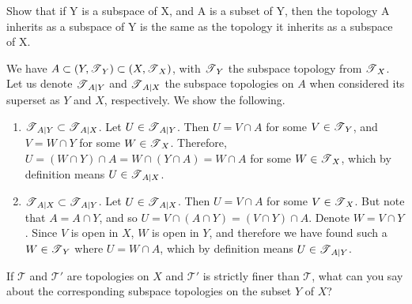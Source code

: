   \begin{exercise}[Munkres 16.1]
    Show that if Y is a subspace of X, and A is a subset of Y, then the topology A inherits as a subspace of Y is the same as the topology it inherits as a subspace of X.
  \end{exercise}
  \begin{solution}[Munkres 16.1]
    We have $A \subset (Y, \T_Y) \subset (X, \T_X)$, with $\T_Y$ the subspace topology from $\T_X$. Let us denote $\T_{A|Y}$ and $\T_{A|X}$ the subspace topologies on $A$ when considered its superset as $Y$ and $X$, respectively. We show the following. 
    \begin{enumerate}
      \item $\T_{A|Y} \subset \T_{A|X}$. Let $U \in \T_{A|Y}$. Then $U = V \cap A$ for some $V \in \T_Y$, and $V = W \cap Y$ for some $W \in \T_X$. Therefore, $U = (W \cap Y) \cap A = W \cap (Y \cap A) = W \cap A$ for some $W \in \T_X$, which by definition means $U \in \T_{A|X}$. 
      \item $\T_{A|X} \subset \T_{A|Y}$. Let $U \in \T_{A|X}$. Then $U = V \cap A$ for some $V \in \T_X$. But note that $A = A \cap Y$, and so $U = V \cap (A \cap Y) = (V \cap Y) \cap A$. Denote $W = V \cap Y$. Since $V$ is open in $X$, $W$ is open in $Y$, and therefore we have found such a $W \in \T_Y$ where $U = W \cap A$, which by definition means $U \in \T_{A|Y}$. 
    \end{enumerate}
  \end{solution}

  \begin{exercise}[Munkres 16.2]
    If $\mathcal{T}$ and $\mathcal{T}'$ are topologies on $X$ and $\mathcal{T}'$ is strictly finer than $\mathcal{T}$, what can you say about the corresponding subspace topologies on the subset $Y$ of $X$?
  \end{exercise}

